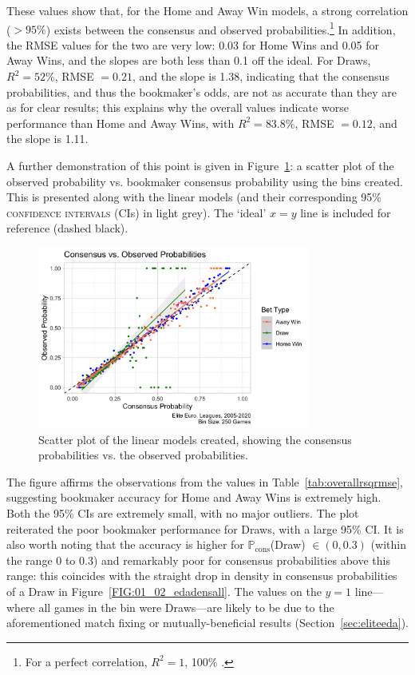 \documentclass[a4paper,10pt]{report}
\begin{document}
These values show that, for the Home and Away Win models, a strong correlation ($>95\%$) exists between the consensus and observed probabilities.\footnote{For a perfect correlation, $R^2=1$, 100\% \autocite{Mendenhall13}.} In addition, the RMSE values for the two are very low: 0.03 for Home Wins and 0.05 for Away Wins, and the slopes are both less than 0.1 off the ideal. For Draws, $R^2 = 52\%$, RMSE $= 0.21$, and the slope is 1.38, indicating that the consensus probabilities, and thus the bookmaker's odds, are not as accurate than they are as for clear results; this explains why the overall values indicate worse performance than Home and Away Wins, with $R^2 = 83.8\%$, RMSE $= 0.12$, and the slope is 1.11.

A further demonstration of this point is given in Figure~\ref{FIG:01_03_scatter}: a scatter plot of the observed probability vs. bookmaker consensus probability using the bins created. This is presented along with the linear models (and their corresponding 95\% \textsc{confidence intervals} (CIs) in light grey). The `ideal' $x=y$ line is included for reference (dashed black).

\begin{figure}[h!]\begin{center}
	\includegraphics[width=0.8\textwidth]{elite_03_scatter.png}
	\caption{Scatter plot of the linear models created, showing the consensus probabilities vs. the observed probabilities.}\label{FIG:01_03_scatter}
\end{center}\end{figure}

The figure affirms the observations from the values in Table~\ref{tab:overallrsqrmse}, suggesting bookmaker accuracy for Home and Away Wins is extremely high. Both the 95\% CIs are extremely small, with no major outliers. The plot reiterated the poor bookmaker performance for Draws, with a large 95\% CI. It is also worth noting that the accuracy is higher for $\mathbb{P}_{\textrm{cons}}$(Draw) $\in(0,0.3)$ (within the range 0 to 0.3) and remarkably poor for consensus probabilities above this range: this coincides with the straight drop in density in consensus probabilities of a Draw in Figure~\ref{FIG:01_02_edadensall}. The values on the $y=1$ line---where all games in the bin were Draws---are likely to be due to the aforementioned match fixing or mutually-beneficial results (Section~\ref{sec:eliteeda}).\vspace{3mm}
\end{document}
